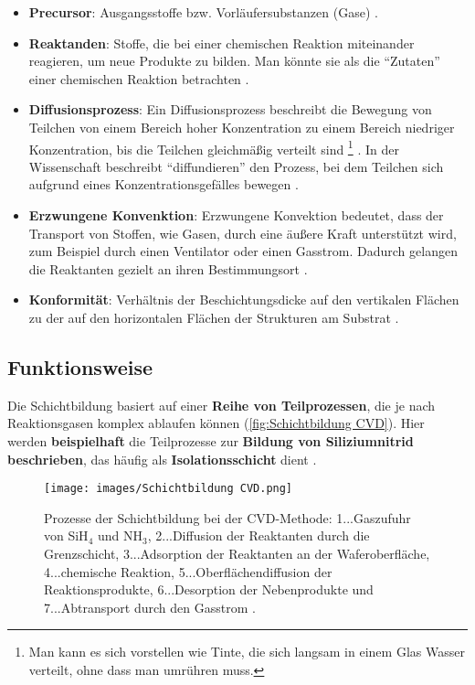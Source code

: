 \documentclass{article} %
\begin{document}
\begin{itemize}
    \item \textbf{Precursor}: Ausgangsstoffe bzw. Vorläufersubstanzen (Gase) \cite{keplinger2024CVD}. 
    \item \textbf{Reaktanden}: Stoffe, die bei einer chemischen Reaktion miteinander reagieren, um neue Produkte zu bilden. Man könnte sie als die ``Zutaten'' 
    einer chemischen Reaktion betrachten \cite{petrucci_general_chemistry, chang_chemistry}.
    \item \textbf{Diffusionsprozess}: Ein Diffusionsprozess beschreibt die Bewegung von Teilchen von einem Bereich hoher Konzentration zu einem Bereich niedriger 
    Konzentration, bis die Teilchen gleichmäßig verteilt sind \footnote{Man kann es sich vorstellen wie Tinte, die sich langsam in einem Glas Wasser verteilt, ohne 
    dass man umrühren muss.} \cite{bergman2011, incropera2007}. In der Wissenschaft beschreibt ``diffundieren'' den Prozess, bei dem Teilchen sich aufgrund eines 
    Konzentrationsgefälles bewegen \cite{crank1975}.
    \item \textbf{Erzwungene Konvenktion}: Erzwungene Konvektion bedeutet, dass der Transport von Stoffen, wie Gasen, durch eine äußere Kraft unterstützt wird, 
    zum Beispiel durch einen Ventilator oder einen Gasstrom. Dadurch gelangen die Reaktanten gezielt an ihren Bestimmungsort \cite{incropera2007, bergman2011, 
    kays2005, bejan2013}.
    \item \textbf{Konformität}: Verhältnis der Beschichtungsdicke auf den vertikalen Flächen zu der auf den horizontalen Flächen der Strukturen am Substrat 
    \cite{keplinger2024CVD}.
\end{itemize}

\vspace{1em}
\subsection{Funktionsweise} %
Die Schichtbildung basiert auf einer \textbf{Reihe von Teilprozessen}, die je nach Reaktionsgasen komplex ablaufen können (\autoref{fig:Schichtbildung CVD}). 
Hier werden \textbf{beispielhaft} die Teilprozesse zur \textbf{Bildung von Siliziumnitrid beschrieben}, das häufig als \textbf{Isolationsschicht} dient 
\cite{keplinger2024CVD}.

\begin{figure}[htb!]
    \centering
    \texttt{[image: images/Schichtbildung CVD.png]} %
    \captionsetup{labelfont=bf} %
    \caption{Prozesse der Schichtbildung bei der CVD-Methode: 1...Gaszufuhr von SiH$_4$ und NH$_3$, 2...Diffusion der Reaktanten durch die Grenzschicht, 
    3...Adsorption der Reaktanten an der Waferoberfläche, 4...chemische Reaktion, 5...Oberflächendiffusion der Reaktionsprodukte, 6...Desorption der Nebenprodukte 
    und 7...Abtransport durch den Gasstrom \cite{keplinger2024CVD}.}
    \label{fig:Schichtbildung CVD}
\end{figure}
\end{document}
